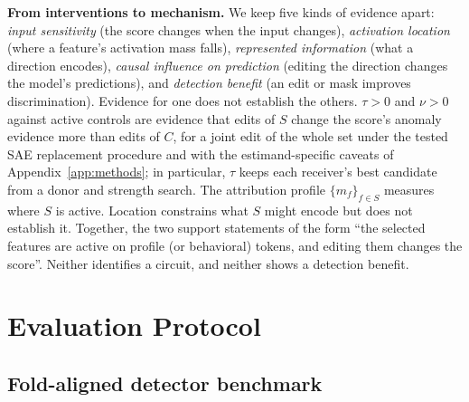 \documentclass[10pt]{article} %
\begin{document}
\textbf{From interventions to mechanism.}
We keep five kinds of evidence apart: \emph{input sensitivity} (the score
changes when the input changes), \emph{activation location} (where a
feature's activation mass falls), \emph{represented information} (what a
direction encodes), \emph{causal influence on prediction} (editing the
direction changes the model's predictions), and \emph{detection benefit} (an
edit or mask improves discrimination). Evidence for one does not establish
the others. $\tau > 0$ and $\nu > 0$ against active controls are evidence
that edits of $S$ change the score's anomaly evidence more than edits of $C$,
for a joint edit of the whole set under the tested SAE replacement procedure
and with the estimand-specific caveats of Appendix~\ref{app:methods}; in
particular, $\tau$ keeps each receiver's best candidate from a donor and
strength search. The attribution profile $\{m_f\}_{f \in S}$ measures where
$S$ is active. Location constrains what $S$ might encode but does not
establish it. Together, the two support statements of the form ``the
selected features are active on profile (or behavioral) tokens, and editing
them changes the score''. Neither identifies a circuit, and neither shows a
detection benefit.

\section{Evaluation Protocol}
\label{sec:protocol}

\subsection{Fold-aligned detector benchmark}
\label{sec:detprotocol}
\end{document}
